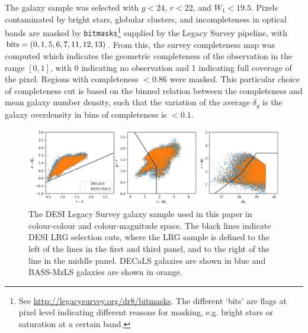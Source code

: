 \documentclass[twocolumn]{aastex631}
\begin{document}
The galaxy sample was selected with $g<24$, $r<22$, and $W_1<19.5$. 
Pixels contaminated by bright stars, globular clusters, and incompleteness in optical bands are masked by \texttt{bitmasks}\footnote{See \url{http://legacysurvey.org/dr8/bitmasks}. The different `bits' are flags at pixel level indicating different reasons for masking, e.g. bright stars or saturation at a certain band.} supplied by the Legacy Survey pipeline, with ${\rm bits}=(0, 1, 5, 6, 7, 11, 12, 13)$.
From this, the survey completeness map was computed which indicates the geometric completeness of the observation in the range $[0,1]$, with 0 indicating no observation and 1 indicating full coverage of the pixel. 
Regions with completeness $<0.86$ were masked. 
{This particular choice of completeness cut is based on the binned relation between the completeness and mean galaxy number density, such that the variation of the average $\delta_g$ is the galaxy overdensity in bins of completeness is $<0.1$.}

\begin{figure}
 \centering
 \includegraphics[width=\linewidth]{figures/legacy_survey_colour_space_selection.png}
 \caption{{The DESI Legacy Survey galaxy sample used in this paper in colour-colour and colour-magnitude space. The black lines indicate DESI LRG selection cuts, where the LRG sample is defined to the left of the lines in the first and third panel, and to the right of the line in the middle panel. DECaLS galaxies are shown in blue and BASS-MzLS galaxies are shown in orange.}} \label{Fig.gal_sel}
\end{figure}
\end{document}
